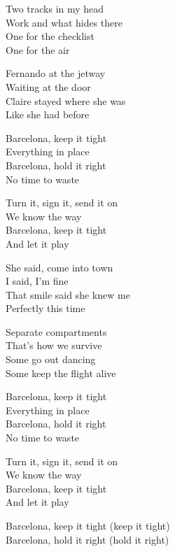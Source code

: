 \begin{lyrics}
Two tracks in my head\\
Work and what hides there\\
One for the checklist\\
One for the air

Fernando at the jetway\\
Waiting at the door\\
Claire stayed where she was\\
Like she had before

Barcelona, keep it tight\\
Everything in place\\
Barcelona, hold it right\\
No time to waste

Turn it, sign it, send it on\\
We know the way\\
Barcelona, keep it tight\\
And let it play

She said, come into town\\
I said, I’m fine\\
That smile said she knew me\\
Perfectly this time

Separate compartments\\
That’s how we survive\\
Some go out dancing\\
Some keep the flight alive

Barcelona, keep it tight\\
Everything in place\\
Barcelona, hold it right\\
No time to waste

Turn it, sign it, send it on\\
We know the way\\
Barcelona, keep it tight\\
And let it play

Barcelona, keep it tight
(keep it tight)\\
Barcelona, hold it right
(hold it right)
\end{lyrics}

